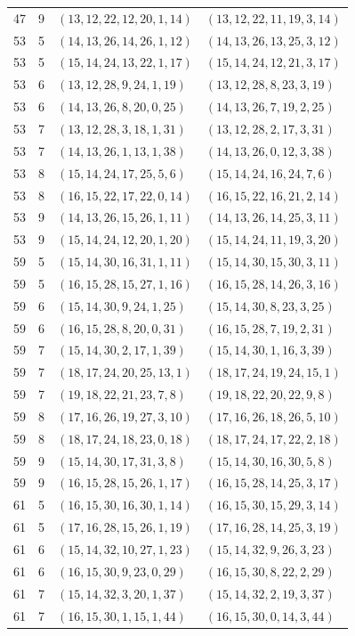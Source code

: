 \begin{longtable}{rrll}
47&9&$(13,12,22,12,20,1,14)$&$(13,12,22,11,19,3,14)$\\
53&5&$(14,13,26,14,26,1,12)$&$(14,13,26,13,25,3,12)$\\
53&5&$(15,14,24,13,22,1,17)$&$(15,14,24,12,21,3,17)$\\
53&6&$(13,12,28,9,24,1,19)$&$(13,12,28,8,23,3,19)$\\
53&6&$(14,13,26,8,20,0,25)$&$(14,13,26,7,19,2,25)$\\
53&7&$(13,12,28,3,18,1,31)$&$(13,12,28,2,17,3,31)$\\
53&7&$(14,13,26,1,13,1,38)$&$(14,13,26,0,12,3,38)$\\
53&8&$(15,14,24,17,25,5,6)$&$(15,14,24,16,24,7,6)$\\
53&8&$(16,15,22,17,22,0,14)$&$(16,15,22,16,21,2,14)$\\
53&9&$(14,13,26,15,26,1,11)$&$(14,13,26,14,25,3,11)$\\
53&9&$(15,14,24,12,20,1,20)$&$(15,14,24,11,19,3,20)$\\
59&5&$(15,14,30,16,31,1,11)$&$(15,14,30,15,30,3,11)$\\
59&5&$(16,15,28,15,27,1,16)$&$(16,15,28,14,26,3,16)$\\
59&6&$(15,14,30,9,24,1,25)$&$(15,14,30,8,23,3,25)$\\
59&6&$(16,15,28,8,20,0,31)$&$(16,15,28,7,19,2,31)$\\
59&7&$(15,14,30,2,17,1,39)$&$(15,14,30,1,16,3,39)$\\
59&7&$(18,17,24,20,25,13,1)$&$(18,17,24,19,24,15,1)$\\
59&7&$(19,18,22,21,23,7,8)$&$(19,18,22,20,22,9,8)$\\
59&8&$(17,16,26,19,27,3,10)$&$(17,16,26,18,26,5,10)$\\
59&8&$(18,17,24,18,23,0,18)$&$(18,17,24,17,22,2,18)$\\
59&9&$(15,14,30,17,31,3,8)$&$(15,14,30,16,30,5,8)$\\
59&9&$(16,15,28,15,26,1,17)$&$(16,15,28,14,25,3,17)$\\
61&5&$(16,15,30,16,30,1,14)$&$(16,15,30,15,29,3,14)$\\
61&5&$(17,16,28,15,26,1,19)$&$(17,16,28,14,25,3,19)$\\
61&6&$(15,14,32,10,27,1,23)$&$(15,14,32,9,26,3,23)$\\
61&6&$(16,15,30,9,23,0,29)$&$(16,15,30,8,22,2,29)$\\
61&7&$(15,14,32,3,20,1,37)$&$(15,14,32,2,19,3,37)$\\
61&7&$(16,15,30,1,15,1,44)$&$(16,15,30,0,14,3,44)$\\

\end{longtable}
